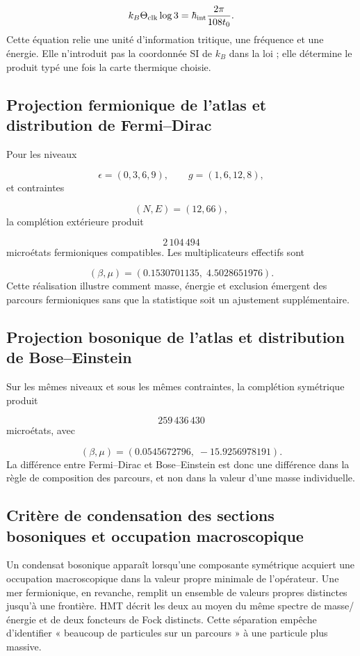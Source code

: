 \[
 k_B\Theta_{\rm clk}\log3
 =\hbar_{\rm int}\frac{2\pi}{108t_0}.
\]
Cette équation relie une unité d'information tritique, une fréquence et une énergie. Elle n'introduit pas la coordonnée SI de \(k_B\) dans la loi ; elle détermine le produit typé une fois la carte thermique choisie.

\subsection{Projection fermionique de l'atlas et distribution de Fermi–Dirac}
Pour les niveaux

\[
 \epsilon=(0,3,6,9),\qquad
 g=(1,6,12,8),
\]
et contraintes

\[
 (N,E)=(12,66),
\]
la complétion extérieure produit

\[
 2\,104\,494
\]
microétats fermioniques compatibles. Les multiplicateurs effectifs sont

\[
 (\beta,\mu)
 =(0.1530701135,\;4.5028651976).
\]
Cette réalisation illustre comment masse, énergie et exclusion émergent des parcours fermioniques sans que la statistique soit un ajustement supplémentaire.

\subsection{Projection bosonique de l'atlas et distribution de Bose–Einstein}
Sur les mêmes niveaux et sous les mêmes contraintes, la complétion symétrique produit

\[
 259\,436\,430
\]
microétats, avec

\[
 (\beta,\mu)
 =(0.0545672796,\;-15.9256978191).
\]
La différence entre Fermi--Dirac et Bose--Einstein est donc une différence dans la règle de composition des parcours, et non dans la valeur d'une masse individuelle.

\subsection{Critère de condensation des sections bosoniques et occupation macroscopique}
Un condensat bosonique apparaît lorsqu'une composante symétrique acquiert une occupation macroscopique dans la valeur propre minimale de l'opérateur. Une mer fermionique, en revanche, remplit un ensemble de valeurs propres distinctes jusqu'à une frontière. HMT décrit les deux au moyen du même spectre de masse/énergie et de deux foncteurs de Fock distincts. Cette séparation empêche d'identifier « beaucoup de particules sur un parcours » à une particule plus massive.

